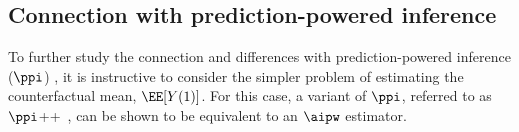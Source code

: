 

 \subsection{Connection with prediction-powered inference}
 To further study the connection and differences with prediction-powered inference ($\ppi$) \cite{angelopoulos2023prediction}, it is instructive to consider the simpler problem of estimating the counterfactual mean, $\EE[Y(1)]$.  For this case, a variant of $\ppi$, referred to as $\ppi$++~\citep{angelopoulos2023ppi++}, can  be shown to be equivalent to an $\aipw$ estimator.

